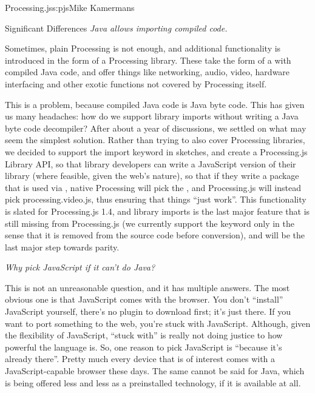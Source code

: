 \begin{aosachapter}{Processing.js}{s:pjs}{Mike Kamermans}
\begin{aosasect1}{Significant Differences}
\emph{Java allows importing compiled code.}

Sometimes, plain Processing is not enough, and additional
functionality is introduced in the form of a Processing library. These
take the form of a  with compiled Java code, and offer
things like networking, audio, video, hardware interfacing and other
exotic functions not covered by Processing itself.

This is a problem, because compiled Java code is Java byte code. This
has given us many headaches: how do we support library imports without
writing a Java byte code decompiler? After about a year of
discussions, we settled on what may seem the simplest solution. Rather
than trying to also cover Processing libraries, we decided to support
the import keyword in sketches, and create a Processing.js Library
API, so that library developers can write a JavaScript version of
their library (where feasible, given the web's nature), so that if
they write a package that is used via ,
native Processing will pick the , and Processing.js
will instead pick processing.video.js, thus ensuring that things
``just work''. This functionality is slated for Processing.js 1.4, and
library imports is the last major feature that is still missing from
Processing.js (we currently support the  keyword only in the
sense that it is removed from the source code before conversion), and
will be the last major step towards parity.

\emph{Why pick JavaScript if it can't do Java?}

This is not an unreasonable question, and it has multiple answers. The
most obvious one is that JavaScript comes with the browser. You don't
``install'' JavaScript yourself, there's no plugin to download first;
it's just there. If you want to port something to the web, you're
stuck with JavaScript. Although, given the flexibility of JavaScript,
``stuck with'' is really not doing justice to how powerful the language
is. So, one reason to pick JavaScript is ``because it's already
there''. Pretty much every device that is of interest comes with a
JavaScript-capable browser these days. The same cannot be said for
Java, which is being offered less and less as a preinstalled
technology, if it is available at all.


\end{aosasect1}
\end{aosachapter}
